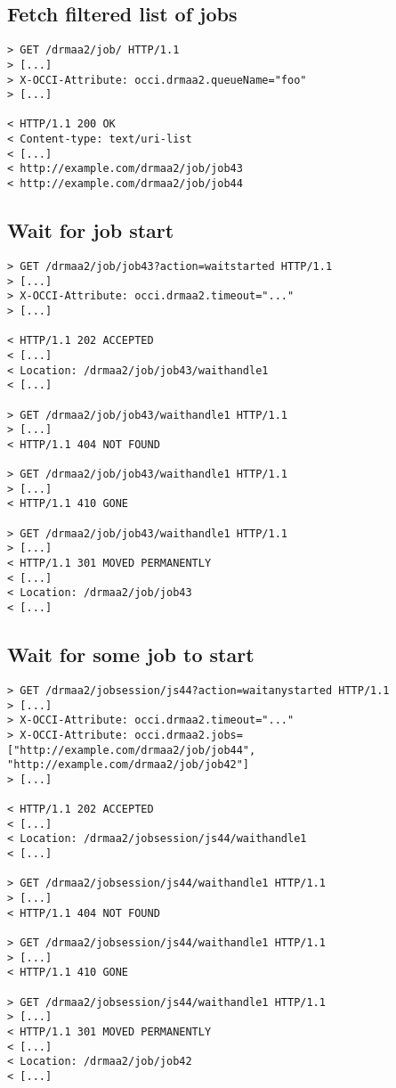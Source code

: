 \documentclass[10pt]{article}
\begin{document}
\subsection{Fetch filtered list of jobs}

\begin{verbatim}
> GET /drmaa2/job/ HTTP/1.1
> [...]
> X-OCCI-Attribute: occi.drmaa2.queueName="foo"
> [...]

< HTTP/1.1 200 OK 
< Content-type: text/uri-list
< [...]
< http://example.com/drmaa2/job/job43
< http://example.com/drmaa2/job/job44
\end{verbatim}


\subsection{Wait for job start}
\label{sec:waitjobstart}

\begin{verbatim}
> GET /drmaa2/job/job43?action=waitstarted HTTP/1.1
> [...] 
> X-OCCI-Attribute: occi.drmaa2.timeout="..."
> [...] 

< HTTP/1.1 202 ACCEPTED
< [...] 
< Location: /drmaa2/job/job43/waithandle1
< [...] 

> GET /drmaa2/job/job43/waithandle1 HTTP/1.1
> [...] 
< HTTP/1.1 404 NOT FOUND

> GET /drmaa2/job/job43/waithandle1 HTTP/1.1
> [...] 
< HTTP/1.1 410 GONE

> GET /drmaa2/job/job43/waithandle1 HTTP/1.1
> [...] 
< HTTP/1.1 301 MOVED PERMANENTLY
< [...] 
< Location: /drmaa2/job/job43
< [...] 
\end{verbatim}

\subsection{Wait for some job to start}
\label{sec:waitanyjobstart}


\begin{verbatim}
> GET /drmaa2/jobsession/js44?action=waitanystarted HTTP/1.1
> [...] 
> X-OCCI-Attribute: occi.drmaa2.timeout="..."
> X-OCCI-Attribute: occi.drmaa2.jobs=["http://example.com/drmaa2/job/job44", "http://example.com/drmaa2/job/job42"]
> [...] 

< HTTP/1.1 202 ACCEPTED
< [...] 
< Location: /drmaa2/jobsession/js44/waithandle1
< [...] 

> GET /drmaa2/jobsession/js44/waithandle1 HTTP/1.1
> [...] 
< HTTP/1.1 404 NOT FOUND

> GET /drmaa2/jobsession/js44/waithandle1 HTTP/1.1
> [...] 
< HTTP/1.1 410 GONE

> GET /drmaa2/jobsession/js44/waithandle1 HTTP/1.1
> [...] 
< HTTP/1.1 301 MOVED PERMANENTLY
< [...] 
< Location: /drmaa2/job/job42
< [...] 
\end{verbatim}
\end{document}
